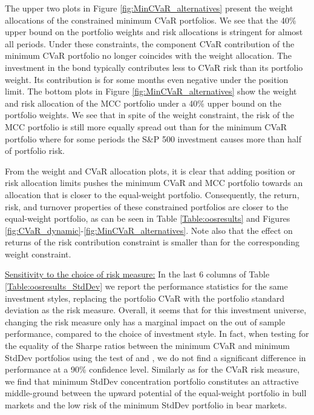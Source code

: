 \documentclass[12pt,a4paper]{article}
\begin{document}
The upper two plots in Figure \ref{fig:MinCVaR_alternatives} present the weight allocations of the constrained minimum CVaR portfolios. We see that the 40\% upper bound on the portfolio weights and risk allocations is stringent for almost all periods. Under these constraints, the component CVaR contribution of the minimum CVaR portfolio no longer coincides with the weight allocation. The investment in the bond typically contributes less to CVaR risk than its portfolio weight. Its contribution is for some months even negative under the position limit. The bottom plots in Figure \ref{fig:MinCVaR_alternatives} show the weight and risk allocation of the MCC portfolio under a 40\% upper bound on the portfolio weights.  We see that in spite of the weight constraint, the risk of the MCC portfolio is still more equally spread out than for the minimum CVaR portfolio where for some periods the S\&P 500 investment causes more than half of portfolio risk.


From the weight and CVaR allocation plots, it is clear that adding position or risk allocation limits pushes the minimum CVaR and MCC portfolio towards an allocation that is closer to the equal-weight portfolio. Consequently, the return, risk, and turnover properties of these constrained portfolios are closer to the equal-weight portfolio, as can be seen in Table \ref{Table:oosresults} and Figures \ref{fig:CVaR_dynamic}-\ref{fig:MinCVaR_alternatives}. Note also that the effect on returns of the risk contribution constraint is smaller than for the corresponding weight constraint.

\medskip

\underline{Sensitivity to the choice of risk measure:}
In the last 6 columns of Table \ref{Table:oosresults_StdDev} we report the performance statistics for the same investment styles, replacing the portfolio CVaR with the portfolio standard deviation as the risk measure. Overall, it seems that for this investment universe,  changing the risk measure only has a marginal impact on the out of sample performance, compared to the choice of investment style. In fact, when testing for the equality of the Sharpe ratios between the minimum CVaR and minimum StdDev portfolios using the test of \citet{JobsonKorkie1981} and \citet{Memmel2003}, we do not find a significant difference in performance at a 90\% confidence level.  Similarly as for the CVaR risk measure, we find that minimum StdDev concentration portfolio constitutes an attractive middle-ground between the upward potential of the equal-weight portfolio in bull markets and the low risk of the minimum StdDev portfolio in bear markets.
\end{document}
